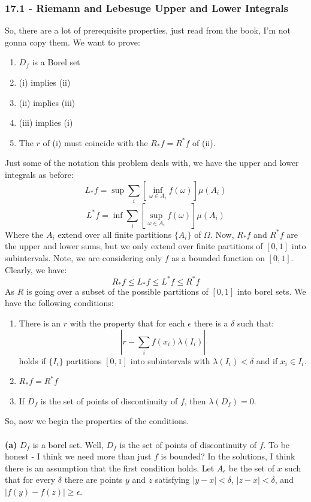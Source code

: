 \documentclass[12pt,a4paper]{article}
\newcommand{\1}[1]{\mathbbm{1}\left\{ #1 \right\}}
\begin{document}
\subsubsection{17.1 - Riemann and Lebesuge Upper and Lower Integrals} So, there are a lot of prerequisite properties, just read from the book, I'm not gonna copy them. We want to prove:
\begin{enumerate}
	\item $D_f$ is a Borel set
	\item (i) implies (ii)
	\item (ii) implies (iii)
	\item (iii) implies (i)
	\item The $r$ of (i) must coincide with the $R_*f = R^*f$ of (ii).
\end{enumerate}
Just some of the notation this problem deals with, we have the upper and lower integrals as before:
$$
	L_*f = \sup \sum_i \left[\inf_{\omega \in A_i} f(\omega)\right] \mu(A_i)
$$
$$
	L^*f = \inf \sum_i \left[\sup_{\omega \in A_i} f(\omega)\right] \mu(A_i)
$$
Where the $A_i$ extend over all finite partitions $\{A_i\}$ of $\Omega$. Now, $R_*f$ and $R^*f$ are the upper and lower sums, but we only extend over finite partitions of $[0,1]$ into subintervals. Note, we are considering only $f$ as a bounded function on $[0,1]$. Clearly, we have:
$$
	R_*f \leq L_*f \leq L^*f \leq R^*f
$$
As $R$ is going over a subset of the possible partitions of $[0,1]$ into borel sets. We have the following conditions:
\begin{enumerate}
	\item There is an $r$ with the property that for each $\epsilon$ there is a $\delta$ such that:
	$$
		\left|r - \sum_i f(x_i)\lambda(I_i)\right|
	$$
	holds if $\{I_i\}$ partitions $[0,1]$ into subintervals with $\lambda(I_i) < \delta$ and if $x_i \in I_i$.
	
	\item $R_*f = R^*f$
	
	\item If $D_f$ is the set of points of discontinuity of $f$, then $\lambda(D_f) = 0$.
\end{enumerate}
So, now we begin the properties of the conditions.
\\\\
\textbf{(a)} $D_f$ is a borel set. Well, $D_f$ is the set of points of discontinuity of $f$. To be honest - I think we need more than just $f$ is bounded? In the solutions, I think there is an assumption that the first condition holds. Let $A_\epsilon$ be the set of $x$ such that for every $\delta$ there are points $y$ and $z$ satisfying $|y - x| < \delta$, $|z - x| < \delta$, and $|f(y) - f(z)| \geq \epsilon$.
\end{document}
